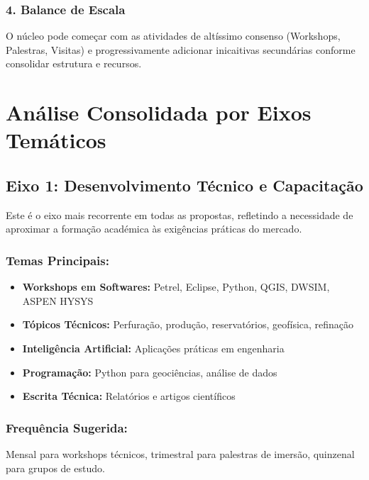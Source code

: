 \documentclass[12pt,a4paper]{article}
\begin{document}
\subsubsection*{4. Balance de Escala}
O núcleo pode começar com as atividades de altíssimo consenso (Workshops, Palestras, Visitas) e progressivamente adicionar inicaitivas secundárias conforme consolidar estrutura e recursos.


\newpage
\section{Análise Consolidada por Eixos Temáticos}

\subsection{Eixo 1: Desenvolvimento Técnico e Capacitação}

Este é o eixo mais recorrente em todas as propostas, refletindo a necessidade de aproximar a formação académica às exigências práticas do mercado.

\subsubsection*{Temas Principais:}
\begin{itemize}[itemsep=0.2cm]
    \item \textbf{Workshops em Softwares:} Petrel, Eclipse, Python, QGIS, DWSIM, ASPEN HYSYS
    \item \textbf{Tópicos Técnicos:} Perfuração, produção, reservatórios, geofísica, refinação
    \item \textbf{Inteligência Artificial:} Aplicações práticas em engenharia
    \item \textbf{Programação:} Python para geociências, análise de dados
    \item \textbf{Escrita Técnica:} Relatórios e artigos científicos
\end{itemize}

\subsubsection*{Frequência Sugerida:}
Mensal para workshops técnicos, trimestral para palestras de imersão, quinzenal para grupos de estudo.
\end{document}
